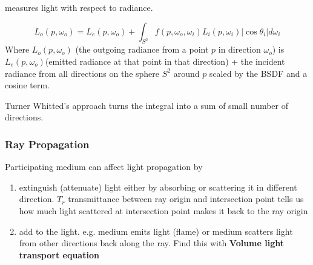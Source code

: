 \documentclass[12pt]{article}
\begin{document}
\begin{theorem}
measures light with respect to radiance. 

$$L_o(p, \omega_o) = L_e(p, \omega_o) + \int_{S^2} f(p, \omega_o, \omega_i)L_i(p, \omega_i)|\cos\theta_i|d\omega_i$$	
Where $L_o(p, \omega_o)$ (the outgoing radiance from a point $p$ in direction $\omega_o$) is $L_e(p, \omega_o)$(emitted radiance at that point in that direction) + the incident radiance from all directions on the sphere $S^2$ around $p$ scaled by the BSDF and a cosine term.
\end{theorem}

Turner Whitted's approach turns the integral into a sum of small number of directions.

\subsubsection{Ray Propagation}
Participating medium can affect light propagation by
\begin{enumerate}
	\item  extinguish (attenuate) light either by absorbing or scattering it in different direction. $T_r$ transmittance between ray origin and intersection point tells us how much light scattered at intersection point makes it back to the ray origin
	\item add to the light. e.g. medium emits light (flame) or medium scatters light from other directions back along the ray. Find this with \textbf{Volume light transport equation}
\end{enumerate}
\end{document}
